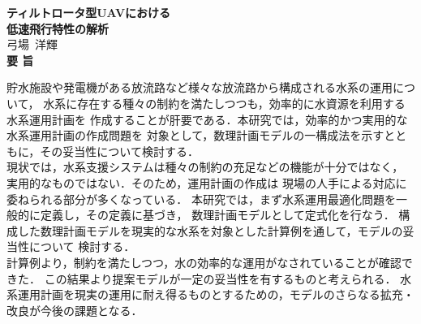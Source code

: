 
\begin{titlepage}
\begin{center}
{\LARGE \bf ティルトロータ型UAVにおける\\低速飛行特性の解析}
\\[0.5cm]
{\Large 弓場~洋輝}
\\[1.0cm]
{\LARGE \bf 要\vspace{36pt}   旨\\}
\end{center}

\indent

貯水施設や発電機がある放流路など様々な放流路から構成される水系の運用について，%
水系に存在する種々の制約を満たしつつも，効率的に水資源を利用する水系運用計画を%
作成することが肝要である．本研究では，効率的かつ実用的な水系運用計画の作成問題を%
対象として，数理計画モデルの一構成法を示すとともに，その妥当性について検討する．
\\
\indent
現状では，水系支援システムは種々の制約の充足などの機能が十分ではなく，%
実用的なものではない．そのため，運用計画の作成は%
現場の人手による対応に委ねられる部分が多くなっている．
本研究では，まず水系運用最適化問題を一般的に定義し，その定義に基づき，%
数理計画モデルとして定式化を行なう．
構成した数理計画モデルを現実的な水系を対象とした計算例を通して，モデルの妥当性について%
検討する．
\\
\indent
計算例より，制約を満たしつつ，水の効率的な運用がなされていることが確認できた．
この結果より提案モデルが一定の妥当性を有するものと考えられる．
水系運用計画を現実の運用に耐え得るものとするための，モデルのさらなる拡充・改良が今後の課題となる．

\end{titlepage}
